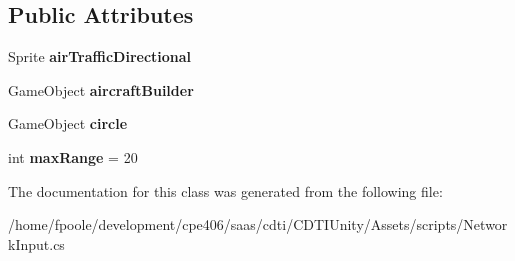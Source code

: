 \subsection*{Public Attributes}
\begin{DoxyCompactItemize}
\item 
\hypertarget{class_network_input_a645c85b706841b9efd9be62cecff9e37}{}Sprite {\bfseries air\+Traffic\+Directional}\label{class_network_input_a645c85b706841b9efd9be62cecff9e37}

\item 
\hypertarget{class_network_input_a4cbaddf7224566f6a01d23a1788b723d}{}Game\+Object {\bfseries aircraft\+Builder}\label{class_network_input_a4cbaddf7224566f6a01d23a1788b723d}

\item 
\hypertarget{class_network_input_a8465b038857f973c9a8b7513ead2b563}{}Game\+Object {\bfseries circle}\label{class_network_input_a8465b038857f973c9a8b7513ead2b563}

\item 
\hypertarget{class_network_input_a3b50fccf39e33592acc615ab7f70abe8}{}int {\bfseries max\+Range} = 20\label{class_network_input_a3b50fccf39e33592acc615ab7f70abe8}

\end{DoxyCompactItemize}


The documentation for this class was generated from the following file\+:\begin{DoxyCompactItemize}
\item 
/home/fpoole/development/cpe406/saas/cdti/\+C\+D\+T\+I\+Unity/\+Assets/scripts/Network\+Input.\+cs\end{DoxyCompactItemize}
